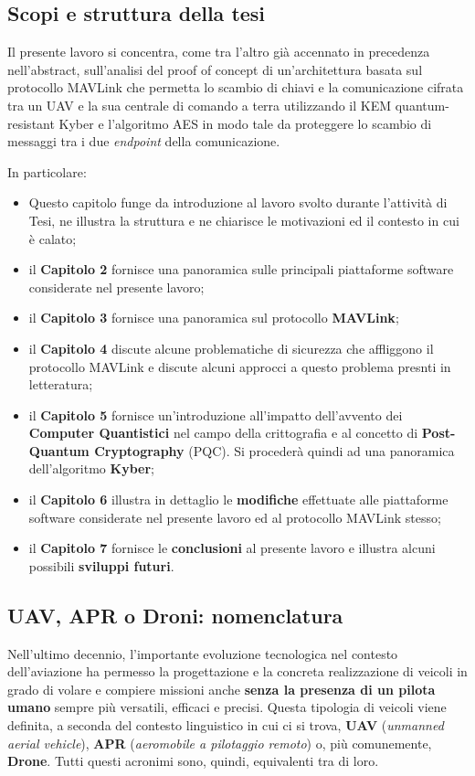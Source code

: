 \documentclass[a4paper, 12pt, oneside]{article}
\theoremstyle{definition}
\begin{document}
\subsection{Scopi e struttura della tesi}
Il presente lavoro si concentra, come tra l'altro già accennato in precedenza nell'abstract, sull'analisi del proof of concept di un'architettura basata sul protocollo MAVLink che permetta lo scambio di chiavi e la comunicazione cifrata tra un UAV e la sua centrale di comando a terra utilizzando il KEM quantum-resistant Kyber e l'algoritmo AES in modo tale da proteggere lo scambio di messaggi tra i due \textit{endpoint} della comunicazione.

In particolare:

\begin{itemize}
    \item Questo capitolo funge da introduzione al lavoro svolto durante l'attività di Tesi, ne illustra la struttura e ne chiarisce le motivazioni ed il contesto in cui è calato;
    \item il \textbf{Capitolo 2} fornisce una panoramica sulle principali piattaforme software considerate nel presente lavoro;
    \item il \textbf{Capitolo 3} fornisce una panoramica sul protocollo \textbf{MAVLink};
    \item il \textbf{Capitolo 4} discute alcune problematiche di sicurezza che affliggono il protocollo MAVLink e discute alcuni approcci a questo problema presnti in letteratura;
    \item il \textbf{Capitolo 5} fornisce un'introduzione all'impatto dell'avvento dei \textbf{Computer Quantistici} nel campo della crittografia e al concetto di \textbf{Post-Quantum Cryptography} (PQC). Si procederà quindi ad una panoramica dell'algoritmo \textbf{Kyber};
    \item il \textbf{Capitolo 6} illustra in dettaglio le \textbf{modifiche} effettuate alle piattaforme software considerate nel presente lavoro ed al protocollo MAVLink stesso;
    \item il \textbf{Capitolo 7} fornisce le \textbf{conclusioni} al presente lavoro e illustra alcuni possibili \textbf{sviluppi futuri}.
\end{itemize}

\newpage


\subsection{UAV, APR o Droni: nomenclatura}
Nell'ultimo decennio, l'importante evoluzione tecnologica nel contesto dell'aviazione ha permesso la progettazione e la concreta realizzazione di veicoli in grado di volare e compiere missioni anche \textbf{senza la presenza di un pilota umano} sempre più versatili, efficaci e precisi. Questa tipologia di veicoli viene definita, a seconda del contesto linguistico in cui ci si trova, \textbf{UAV} (\textit{unmanned aerial vehicle}), \textbf{APR} (\textit{aeromobile a pilotaggio remoto}) o, più comunemente, \textbf{Drone}. Tutti questi acronimi sono, quindi, equivalenti tra di loro. 
\end{document}
